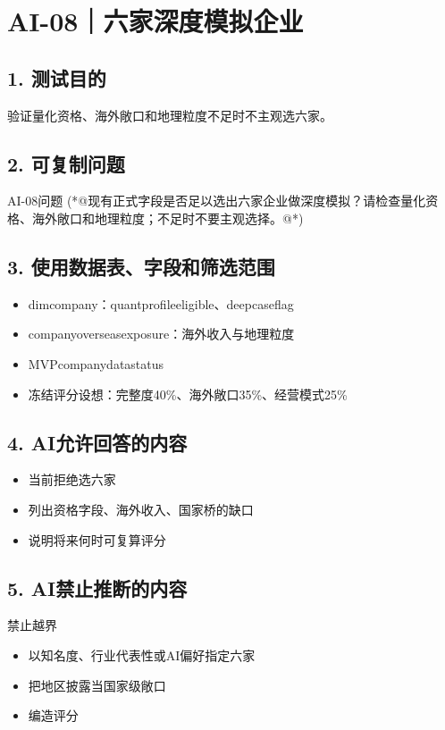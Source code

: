 \documentclass[UTF8,openany,zihao=-4]{ctexbook}
\renewcommand{\_}{\textunderscore\allowbreak}
\begin{document}
\clearpage
\section{AI-08｜六家深度模拟企业}
\subsection*{1. 测试目的}
验证量化资格、海外敞口和地理粒度不足时不主观选六家。


\subsection*{2. 可复制问题}
\begin{PromptBox}{AI-08问题}
(*@{\promptcjk 现有正式字段是否足以选出六家企业做深度模拟？请检查量化资格、海外敞口和地理粒度；不足时不要主观选择。}@*)
\end{PromptBox}

\subsection*{3. 使用数据表、字段和筛选范围}
\begin{itemize}
\item dim\_company：quant\_profile\_eligible、deep\_case\_flag
\item company\_overseas\_exposure：海外收入与地理粒度
\item MVP\_company\_data\_status
\item 冻结评分设想：完整度40\%、海外敞口35\%、经营模式25\%
\end{itemize}

\subsection*{4. AI允许回答的内容}
\begin{itemize}
\item 当前拒绝选六家
\item 列出资格字段、海外收入、国家桥的缺口
\item 说明将来何时可复算评分
\end{itemize}

\subsection*{5. AI禁止推断的内容}
\begin{dangerbox}{禁止越界}
\begin{itemize}
\item 以知名度、行业代表性或AI偏好指定六家
\item 把地区披露当国家级敞口
\item 编造评分
\end{itemize}
\end{dangerbox}
\end{document}
